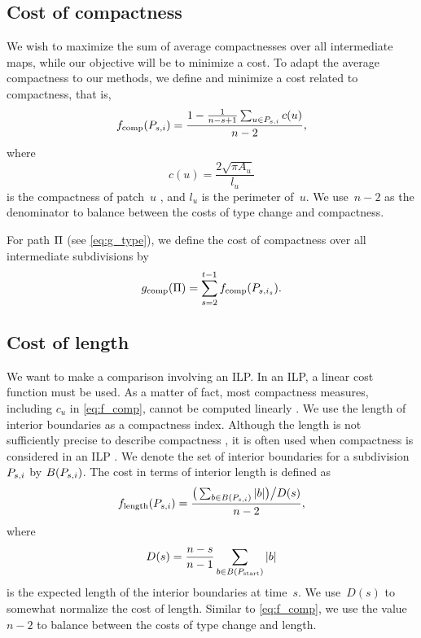\subsection{Cost of compactness}


We wish to maximize the sum of average compactnesses 
over all intermediate maps,
while our objective will be to minimize a cost.
To adapt the average compactness to our methods, 
we define and minimize a cost related to compactness, that is,
\begin{equation}
\label{eq:f_comp}
f_{\mathrm{comp}}(P_{s,i})=
\frac{1-\frac{1}{n-s+1} \sum_{u\in P_{s,i}}c(u)}{n-2},
\end{equation}
where
\begin{equation}
\label{eq:comp}
c(u)=\frac{2 \sqrt{\pi A_u}}{l_u}
\end{equation}
is the compactness of patch~$u$ \citep{Frolov1975}, 
and $l_u$ is the perimeter of~$u$. 
We use~$n-2$ as the denominator to balance 
between the costs of type change and compactness.

For path $\Pi$ (see \eq\ref{eq:g_type}), 
we define the cost of compactness over all 
intermediate subdivisions by
\begin{equation}
\label{eq:g_comp}
g_\mathrm{comp}(\Pi)=
\sum_{s=2}^{t-1}f_{\mathrm{comp}}(P_{s,i_s}).
\end{equation}


\subsection{Cost of length}
\label{sec:AreaAgg_costlength}

We want to make a comparison involving an ILP.
In an ILP, a linear cost function must be used.
As a matter of fact, most compactness measures, 
including $c_u$ in \eq\ref{eq:f_comp}, 
cannot be computed linearly
\parencite[see more measures in][]{Maceachren1985}.
We use the length of interior boundaries as a compactness index.
Although the length is not sufficiently precise 
to describe compactness 
\parencite[see for example][]{Young1988}, 
it is often used when compactness is considered in an ILP
\parencite[e.g.,][]{Minas2016,HaunertWolff2010AreaAgg,Wright1983}.
We denote the set of interior boundaries for a subdivision
$P_{s,i}$ by $B(P_{s,i})$.
The cost in terms of interior length is defined as
\begin{equation}
\label{eq:f_length}
f_{\mathrm{length}}(P_{s,i})=
\frac{\big(\sum_{b\in B (P_{s,i})} 
|b|\big)\big/D(s)}{n-2}, 
\end{equation} 
where 
\begin{equation}
\label{eq:AreaAgg_Norm}
D(s)=\frac{n-s}{n-1} \sum_{b\in B (P_\mathrm{start})} |b|
\end{equation}
is the expected length of the interior boundaries at time~$s$. 
We use~$D(s)$ to somewhat normalize the cost of length. 
Similar to \eq\ref{eq:f_comp}, 
we use the value~$n-2$ 
to balance between the costs of type change and length.

